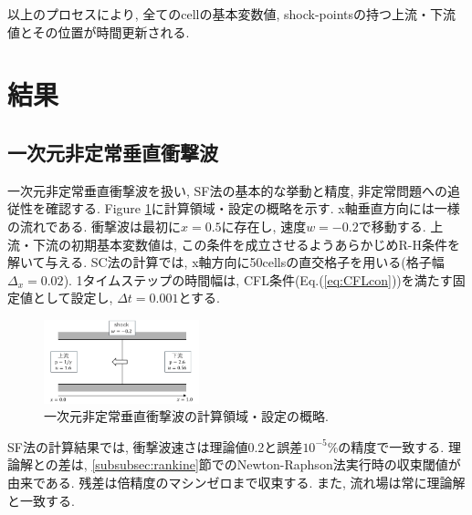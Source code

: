 \documentclass[a4j]{jarticle}
\begin{document}
以上のプロセスにより, 全てのcellの基本変数値, shock-pointsの持つ上流・下流値とその位置が時間更新される.

\section{結果}
\subsection{一次元非定常垂直衝撃波}\label{subsec:1D}

一次元非定常垂直衝撃波を扱い, SF法の基本的な挙動と精度, 非定常問題への追従性を確認する.
Figure \ref{fig:1Dsituation}に計算領域・設定の概略を示す.
x軸垂直方向には一様の流れである.
衝撃波は最初に$x=0.5$に存在し, 速度$w=-0.2$で移動する.
上流・下流の初期基本変数値は, この条件を成立させるようあらかじめR-H条件を解いて与える.
SC法の計算では, x軸方向に50cellsの直交格子を用いる(格子幅$\Delta_x = 0.02$).
1タイムステップの時間幅は, CFL条件(Eq.(\ref{eq:CFLcon}))を満たす固定値として設定し, $\Delta t = 0.001$とする.
\begin{figure}[H]
    \begin{center}
        \includegraphics[width=0.4\textwidth]{1Dsituation.pdf}
    \end{center}
    \caption{一次元非定常垂直衝撃波の計算領域・設定の概略.}
    \label{fig:1Dsituation}
\end{figure}
SF法の計算結果では, 衝撃波速さは理論値0.2と誤差$10^{-5}$\%の精度で一致する.
理論解との差は, \ref{subsubsec:rankine}節でのNewton-Raphson法実行時の収束閾値が由来である. 
残差は倍精度のマシンゼロまで収束する. また, 流れ場は常に理論解と一致する.
\end{document}
